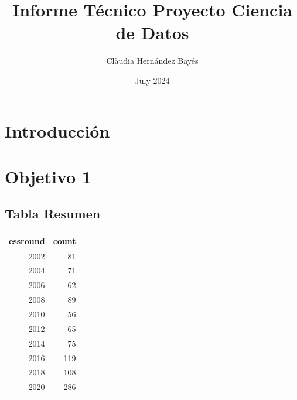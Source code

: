 \documentclass{article}
\title{Informe Técnico Proyecto Ciencia de Datos}
\author{Clàudia Hernández Bayés}
\date{July 2024}
\begin{document}


\maketitle
\tableofcontents


\section*{Introducción}


\section*{Objetivo 1}
\subsection{Tabla Resumen}

\begin{table}[ht]
\centering
\begin{tabular}{rr}
  \hline
essround & count \\ 
  \hline
2002 &  81 \\ 
  2004 &  71 \\ 
  2006 &  62 \\ 
  2008 &  89 \\ 
  2010 &  56 \\ 
  2012 &  65 \\ 
  2014 &  75 \\ 
  2016 & 119 \\ 
  2018 & 108 \\ 
  2020 & 286 \\ 
   \hline
\end{tabular}
\end{table}
\end{document}
